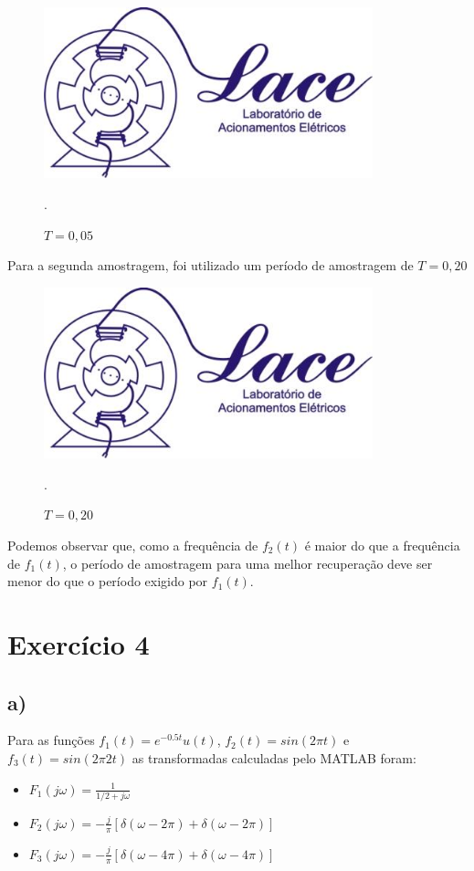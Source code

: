 \documentclass[a4paper,12pt,oneside,openany,table,xcdraw]{article}
\begin{document}
\begin{figure}[H]
    \centering
    \includegraphics[width=0.85\textwidth]{a}
    \caption{$T = 0,05$}.
    \label{fig:my_label}
\end{figure}

Para a segunda amostragem, foi utilizado um período de amostragem de $T = 0,20$

\begin{figure}[H]
    \centering
    \includegraphics[width=0.85\textwidth]{a}
    \caption{$T = 0,20$}.
    \label{fig:my_label}
\end{figure}

Podemos observar que, como a frequência de $f_2(t)$ é maior do que a frequência de $f_1(t)$, o período de amostragem para uma melhor recuperação deve ser menor do que o período exigido por $f_1(t)$.

\section{Exercício 4}
\subsection{a)}
Para as funções $f_1(t)=e^{-0.5t}u(t)$, $f_2(t)=sin(2\pi t)$ e $f_3(t)=sin(2\pi2t)$ as transformadas calculadas pelo MATLAB foram:
\begin{itemize}
    \item $F_1(j\omega)=\frac{1}{1/2 + j\omega}$
    \item $F_2(j\omega)=-\frac{j}{\pi}[\delta(\omega-2\pi)+\delta(\omega-2\pi)]$
    \item $F_3(j\omega)=-\frac{j}{\pi}[\delta(\omega-4\pi)+\delta(\omega-4\pi)]$
\end{itemize}
\end{document}
